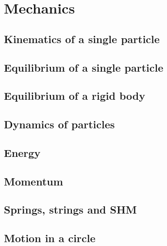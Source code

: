 \documentclass[main.tex]{subfiles}
\begin{document}
	\chapter{Mechanics}
	\section{Kinematics of a single particle}
	
	\section{Equilibrium of a single particle}
	
	\section{Equilibrium of a rigid body}
	
	\section{Dynamics of particles}
	
	\section{Energy}
	
	\section{Momentum}
	
	\section{Springs, strings and SHM}
	
	\section{Motion in a circle}
\end{document}
